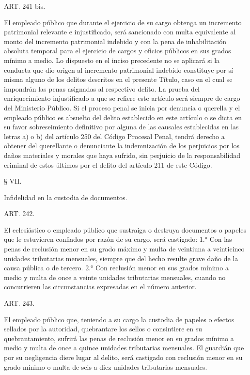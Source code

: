    
    ART. 241 bis.

    El empleado público que durante el ejercicio de su cargo obtenga un incremento patrimonial relevante e injustificado, será sancionado con multa equivalente al monto del incremento patrimonial indebido y con la pena de inhabilitación absoluta temporal para el ejercicio de cargos y oficios públicos en sus grados mínimo a medio.
    Lo dispuesto en el inciso precedente no se aplicará si la conducta que dio origen al incremento patrimonial indebido constituye por sí misma alguno de los delitos descritos en el presente Título, caso en el cual se impondrán las penas asignadas al respectivo delito.
    La prueba del enriquecimiento injustificado a que se refiere este artículo será siempre de cargo del Ministerio Público.
    Si el proceso penal se inicia por denuncia o querella y el empleado público es absuelto del delito establecido en este artículo o se dicta en su favor sobreseimiento definitivo por alguna de las causales establecidas en las letras a) o b) del artículo 250 del Código Procesal Penal, tendrá derecho a obtener del querellante o denunciante la indemnización de los perjuicios por los daños materiales y morales que haya sufrido, sin perjuicio de la responsabilidad criminal de estos últimos por el delito del artículo 211 de este Código.


    § VII.

    Infidelidad en la custodia de documentos.


    ART. 242.

    El eclesiástico o empleado público que sustraiga o destruya documentos o papeles que le estuvieren confiados por razón de su cargo, será castigado:
    1.° Con las penas de reclusión menor en su grado máximo y multa de veintiuna a veinticinco unidades tributarias mensuales, siempre que del hecho resulte grave daño de la causa pública o de tercero.
    2.° Con reclusión menor en sus grados mínimo a medio y multa de once a veinte unidades tributarias mensuales, cuando no concurrieren las circunstancias expresadas en el número anterior.





    ART. 243.

    El empleado público que, teniendo a su cargo la custodia de papeles o efectos sellados por la autoridad, quebrantare los sellos o consintiere en su quebrantamiento, sufrirá las penas de reclusión menor en su grados mínimo a medio y multa de once a quince unidades tributarias mensuales.
    El guardián que por su negligencia diere lugar al delito, será castigado con reclusión menor en su grado mínimo o multa de seis a diez unidades tributarias mensuales.





